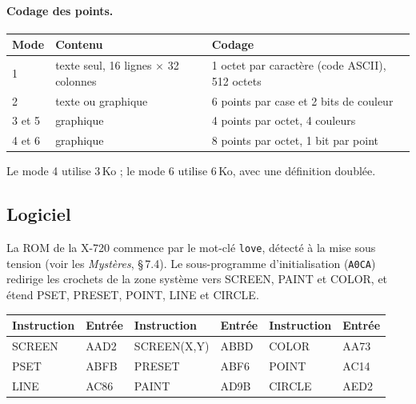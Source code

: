 \documentclass[a4paper,10pt]{article}
\newcommand{\hex}[1]{\texttt{#1}}
\begin{document}
\paragraph{Codage des points.}
\begin{center}\small
\begin{tabular}{@{}lll@{}}
\toprule
Mode & Contenu & Codage \\
\midrule
1 & texte seul, 16 lignes $\times$ 32 colonnes & 1 octet par caractère (code ASCII), 512 octets \\
2 & texte ou graphique & 6 points par case et 2 bits de couleur \\
3 et 5 & graphique & 4 points par octet, 4 couleurs \\
4 et 6 & graphique & 8 points par octet, 1 bit par point \\
\bottomrule
\end{tabular}
\end{center}
Le mode 4 utilise 3\,Ko ; le mode 6 utilise 6\,Ko, avec une définition
doublée.

\subsection{Logiciel}
La ROM de la X-720 commence par le mot-clé \texttt{love}, détecté à la mise
sous tension (voir les \emph{Mystères}, §\,7.4). Le sous-programme
d'initialisation (\hex{A0CA}) redirige les crochets de la zone système vers
SCREEN, PAINT et COLOR, et étend PSET, PRESET, POINT, LINE et CIRCLE.

\begin{center}\small
\begin{tabular}{@{}l>{\ttfamily}l|l>{\ttfamily}l|l>{\ttfamily}l@{}}
\toprule
Instruction & \normalfont Entrée & Instruction & \normalfont Entrée & Instruction & \normalfont Entrée \\
\midrule
SCREEN & AAD2 & SCREEN(X,Y) & ABBD & COLOR & AA73 \\
PSET & ABFB & PRESET & ABF6 & POINT & AC14 \\
LINE & AC86 & PAINT & AD9B & CIRCLE & AED2 \\
\bottomrule
\end{tabular}
\end{center}
\end{document}
